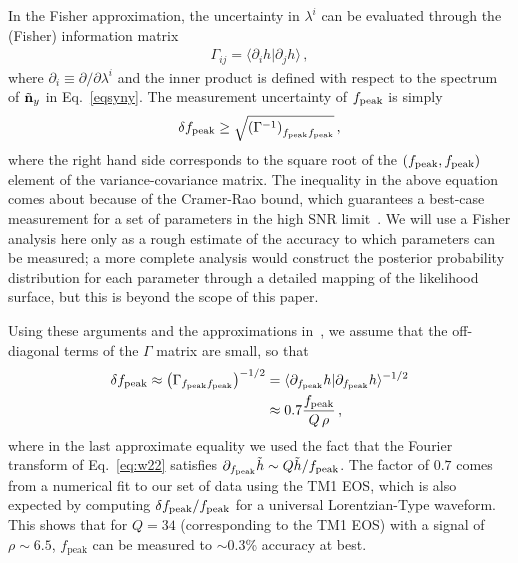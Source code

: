 \documentclass[prd,aps,floatfix,superscriptaddress,nofootinbib,twocolumn,10pt,English]{revtex4-1}
\begin{document}
In the Fisher approximation, the uncertainty in $\lambda^{i}$ can be
evaluated through the (Fisher) information matrix
\begin{align}
\Gamma_{ij} = \langle \partial_i h | \partial_j h\rangle\,,
\end{align}
where $\partial_i \equiv \partial/\partial \lambda^i$ and the
inner product is defined with respect to the spectrum of $\tilde {\bf
  n}_y$ in Eq.~\eqref{eqsyny}. The measurement uncertainty of $f_{\rm peak}$ is simply
\begin{align}
\delta f_{\rm peak} \geq \sqrt{\left(\Gamma^{-1} \right)_{f_{\rm peak} f_{\rm peak}}}\,,
\end{align}
where the right hand side corresponds to the square root of 
the $(f_{\rm peak},f_{\rm peak})$ element of the
variance-covariance matrix.  The inequality in the above equation
comes about because of the Cramer-Rao bound, which guarantees a
best-case measurement for a set of parameters in the high SNR
limit~\cite{Vallisneri:2007ev}.  We will use a Fisher analysis here
only as a rough estimate of the accuracy to which parameters can be
measured; a more complete analysis would construct the posterior
probability distribution for each parameter through a detailed mapping
of the likelihood surface, but this is beyond the scope of this paper.

Using these arguments and the approximations
in~\cite{clark2016observing}, we assume that the off-diagonal terms of the
$\Gamma$ matrix are small, 
so that
\begin{align}
\label{eq:delta-f}
\delta f_{\rm peak} \approx \left(\Gamma_{f_{\rm peak}f_{\rm peak}}\right)^{-1/2} &=\langle
\partial_{f_{\rm peak}} h | \partial_{f_{\rm peak}} h \rangle^{-1/2} \nonumber \\
& \approx 0.7\frac{f_{\rm peak}}{Q \,\rho}\,,
\end{align}
where in the last approximate equality we used the fact that the
Fourier transform of Eq.~\eqref{eq:w22} satisfies $\partial_{f_{\rm
    peak}} \tilde{h} \sim Q\tilde{h}/f_{\rm peak}$.  The factor of
$0.7$ comes from a numerical fit to our set of data using the TM1 EOS,
which is also expected by computing $\delta f_{\rm peak}/f_{\rm peak}$
for a universal Lorentzian-Type waveform. This shows that for $Q=34$
(corresponding to the TM1 EOS) with a signal of $\rho \sim 6.5$,
$f_\mathrm{peak}$ can be measured to $\sim 0.3$\% accuracy at best.
\end{document}
